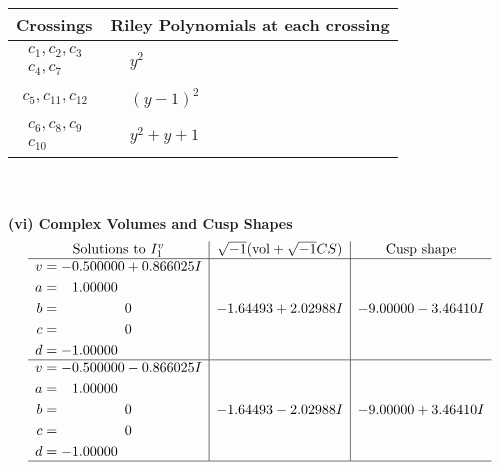 \documentclass[1p]{elsarticle_modified}
\theoremstyle{definition}
\newcommand{\I}{\sqrt{-1}}
\begin{document}
\begin{tabular}{m{50pt}|m{274pt}}
Crossings & \hspace{64pt}Riley Polynomials at each crossing \\
\hline $$\begin{aligned}c_{1},c_{2},c_{3}\\c_{4},c_{7}\end{aligned}$$&$\begin{aligned}
&y^2
\end{aligned}$\\
\hline $$\begin{aligned}c_{5},c_{11},c_{12}\end{aligned}$$&$\begin{aligned}
&(y-1)^2
\end{aligned}$\\
\hline $$\begin{aligned}c_{6},c_{8},c_{9}\\c_{10}\end{aligned}$$&$\begin{aligned}
&y^2+y+1
\end{aligned}$\\
\hline
\end{tabular}\\~\\
\newpage\flushleft \textbf{(vi) Complex Volumes and Cusp Shapes}
$$\begin{array}{c|c|c}  
\text{Solutions to }I^v_{1}& \I (\text{vol} + \sqrt{-1}CS) & \text{Cusp shape}\\
 \hline 
\begin{aligned}
v &= -0.500000 + 0.866025 I \\
a &= \phantom{-}1.00000\phantom{ +0.000000I} \\
b &= \phantom{-0.000000 } 0 \\
c &= \phantom{-0.000000 } 0 \\
d &= -1.00000\phantom{ +0.000000I}\end{aligned}
 & -1.64493 + 2.02988 I & -9.00000 - 3.46410 I \\ \hline\begin{aligned}
v &= -0.500000 - 0.866025 I \\
a &= \phantom{-}1.00000\phantom{ +0.000000I} \\
b &= \phantom{-0.000000 } 0 \\
c &= \phantom{-0.000000 } 0 \\
d &= -1.00000\phantom{ +0.000000I}\end{aligned}
 & -1.64493 - 2.02988 I & -9.00000 + 3.46410 I\\
 \hline 
 \end{array}$$\newpage\newpage\renewcommand{\arraystretch}{1}
\end{document}
